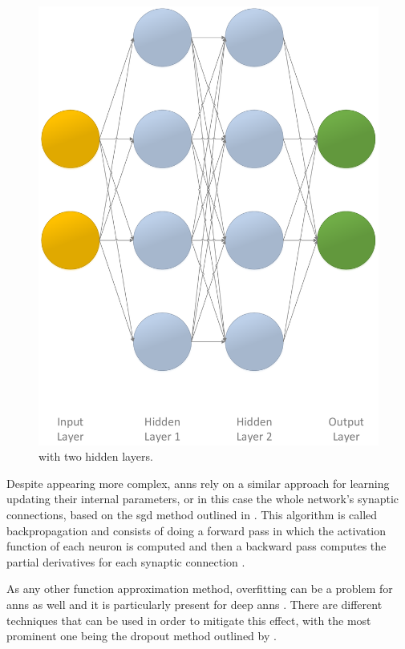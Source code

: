 \begin{figure}[!ht]
\begin{minipage}[b]{0.45\textwidth}
		\includegraphics[width=\textwidth]{img/ann_2h}
		\caption{ with two hidden layers.}
		\label{fig:ann_2h}
	\end{minipage}
\end{figure}

Despite appearing more complex, \glspl{ann} rely on a similar approach for learning \ie updating their internal parameters, or in this case the whole network's synaptic connections, based on the \gls{sgd} method outlined in  \citep[p. 217]{Sutton2017}. This algorithm is called backpropagation and consists of doing a forward pass in which the activation function of each neuron is computed and then a backward pass computes the partial derivatives for each synaptic connection \citep[p. 218]{Sutton2017}.

As any other function approximation method, overfitting can be a problem for \glspl{ann} as well and it is particularly present for deep \glspl{ann} \citep[p. 218]{Sutton2017}. There are different techniques that can be used in order to mitigate this effect, with the most prominent one being the dropout method outlined by \citet{Srivastava2014}.

